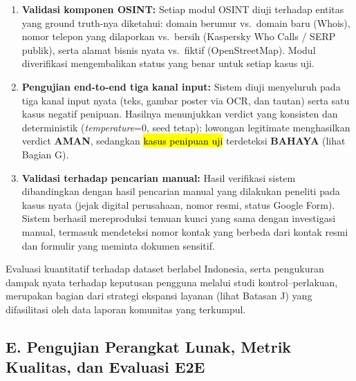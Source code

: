 \documentclass[12pt,a4paper]{article}
\newcommand{\revisi}[1]{\hl{#1}}
\begin{document}
\begin{enumerate}[label=\textbf{\arabic*.}]
\item \textbf{Validasi komponen OSINT:} Setiap modul OSINT diuji terhadap entitas yang ground
truth-nya diketahui: domain berumur vs.\ domain baru (Whois), nomor telepon yang dilaporkan vs.\
bersih (Kaspersky Who Calls / SERP publik), serta alamat bisnis nyata vs.\ fiktif (OpenStreetMap).
Modul diverifikasi mengembalikan status yang benar untuk setiap kasus uji.

\item \textbf{Pengujian end-to-end tiga kanal input:} Sistem diuji menyeluruh pada tiga kanal input
nyata (teks, gambar poster via OCR, dan tautan) serta satu kasus negatif penipuan. Hasilnya
menunjukkan verdict yang konsisten dan deterministik (\textit{temperature}=0, seed tetap):
lowongan legitimate menghasilkan verdict \textbf{AMAN}, sedangkan \revisi{kasus penipuan uji}
terdeteksi \textbf{BAHAYA} (lihat Bagian G).

\item \textbf{Validasi terhadap pencarian manual:} Hasil verifikasi sistem dibandingkan dengan hasil
pencarian manual yang dilakukan peneliti pada kasus nyata (jejak digital perusahaan, nomor resmi,
status Google Form). Sistem berhasil mereproduksi temuan kunci yang sama dengan investigasi
manual, termasuk mendeteksi nomor kontak yang berbeda dari kontak resmi dan formulir yang meminta
dokumen sensitif.
\end{enumerate}

Evaluasi kuantitatif terhadap dataset berlabel Indonesia, serta pengukuran dampak nyata
terhadap keputusan pengguna melalui studi kontrol--perlakuan, merupakan bagian dari strategi ekspansi
layanan (lihat Batasan J) yang difasilitasi oleh data laporan komunitas yang terkumpul.

\subsection*{\colorbox{yellow!40}{\textbf{E. Pengujian Perangkat Lunak, Metrik Kualitas, dan Evaluasi E2E}}}
\phantomsection
{}
\end{document}
